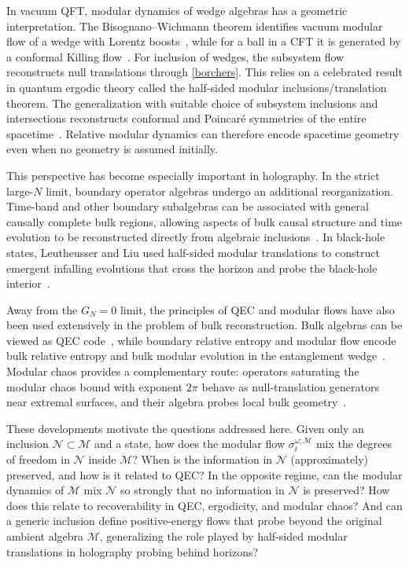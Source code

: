 \documentclass[a4paper,11pt]{article}
\theoremstyle{definition}
\newcommand{\mN}{\mathcal{N}}
\newcommand{\mM}{\mathcal{M}}
\begin{document}
In vacuum QFT, modular dynamics of wedge algebras has a geometric interpretation.  The Bisognano--Wichmann theorem identifies vacuum modular flow of a wedge with Lorentz boosts~\cite{BisognanoWichmann1975}, while for a ball in a CFT it is generated by a conformal Killing flow~\cite{CasiniHuertaMyers2011}. For inclusion of wedges, the subsystem flow reconstructs null translations through \eqref{borchers}. This relies on a celebrated result in quantum ergodic theory called the 
half-sided modular inclusions/translation theorem. The generalization with suitable choice of subsystem inclusions and intersections reconstructs conformal and Poincar\'e symmetries of the entire spacetime~\cite{Wiesbrock1993,Borchers1992,Wiesbrock1993b,GuidoLongoWiesbrock1998,ArakiZsido2005}.  Relative modular dynamics can therefore encode spacetime geometry even when no geometry is assumed initially. 

This perspective has become especially important in holography. In the strict large-$N$ limit, boundary operator algebras undergo an additional reorganization.  Time-band and other boundary subalgebras can be associated with general causally complete bulk regions, allowing aspects of bulk causal structure and time evolution to be reconstructed directly from algebraic inclusions~\cite{LeutheusserLiuSubregion}.  In black-hole states, Leutheusser and Liu used half-sided modular translations to construct emergent infalling evolutions that cross the horizon and probe the black-hole interior~\cite{LeutheusserLiuCausal,LeutheusserLiu2023}.

Away from the $G_N=0$ limit, the principles of QEC and modular flows have also been used extensively in the problem of bulk reconstruction. Bulk algebras can be viewed as QEC code~\cite{AlmheiriDongHarlow2015}, while boundary relative entropy and modular flow encode bulk relative entropy and bulk modular evolution in the entanglement wedge~\cite{JafferisLewkowyczMaldacenaSuh2016}.  Modular chaos provides a complementary route: operators saturating the modular chaos bound with exponent $2\pi$ behave as null-translation generators near extremal surfaces, and their algebra probes local bulk geometry~\cite{deBoerLamprou2020,faulkner2019modular}. 

These developments motivate the questions addressed here.  Given only an inclusion $\mN\subset\mM$ and a state, how does the modular flow $\sigma_t^{\omega;\mM}$ mix the degrees of freedom in $\mN$ inside $\mM$? When is the information in $\mN$ (approximately) preserved, and how is it related to QEC? In the opposite regime, can the modular dynamics of $\mM$ mix $\mN$ so strongly that no information in $\mN$ is preserved? How does this relate to recoverability in QEC, ergodicity, and modular chaos?  And can a generic inclusion define positive-energy flows that probe beyond the original ambient algebra $\mM$, generalizing the role played by half-sided modular translations in holography probing behind horizons?
\end{document}

